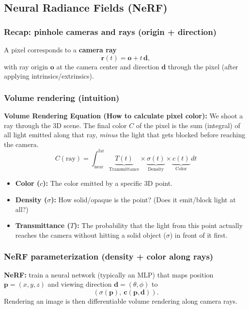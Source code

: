 \documentclass[11pt,a4paper]{article}
\newcommand{\vct}[1]{\bm{#1}}
\begin{document}
\subsection{Neural Radiance Fields (NeRF)}

\subsubsection{Recap: pinhole cameras and rays (origin + direction)}
\begin{defbox}
A pixel corresponds to a \textbf{camera ray}
\[
\vct{r}(t)=\vct{o}+t\,\vct{d},
\]
with ray origin $\vct{o}$ at the camera center and direction $\vct{d}$ through the pixel (after applying intrinsics/extrinsics).
\end{defbox}

\subsubsection{Volume rendering (intuition)}

\begin{mathrule}
\textbf{Volume Rendering Equation (How to calculate pixel color):}
We shoot a ray through the 3D scene. The final color $C$ of the pixel is the sum (integral) of all light emitted along that ray, \emph{minus} the light that gets blocked before reaching the camera.
\[
C(\text{ray}) = \int_{\text{near}}^{\text{far}} \underbrace{T(t)}_{\text{Transmittance}} \times \underbrace{\sigma(t)}_{\text{Density}} \times \underbrace{c(t)}_{\text{Color}} \,dt
\]
\begin{itemize}
  \item \textbf{Color ($c$):} The color emitted by a specific 3D point.
  \item \textbf{Density ($\sigma$):} How solid/opaque is the point? (Does it emit/block light at all?)
  \item \textbf{Transmittance ($T$):} The probability that the light from this point actually reaches the camera without hitting a solid object ($\sigma$) in front of it first.
\end{itemize}
\end{mathrule}

\subsubsection{NeRF parameterization (density + color along rays)}
\begin{defbox}
\textbf{NeRF:} train a neural network (typically an MLP) that maps
position $\vct{p}=(x,y,z)$ and viewing direction $\vct{d}=(\theta,\phi)$ to
\[
(\sigma(\vct{p}),\ \vct{c}(\vct{p},\vct{d})).
\]
Rendering an image is then differentiable volume rendering along camera rays.
\end{defbox}
\end{document}
